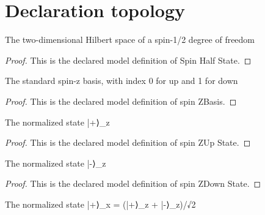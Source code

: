 \section{Declaration topology}
\begin{definition}
  \label{def:physics:phyx-mini-0543:phyxminiproblems-problemphyxmini0543-spinhalfstate}
  The two-dimensional Hilbert space of a spin-1/2 degree of freedom
\end{definition}
\begin{proof}
  This is the declared model definition of Spin Half State.
\end{proof}
\begin{definition}
  \label{def:physics:phyx-mini-0543:phyxminiproblems-problemphyxmini0543-spinzbasis}
  The standard spin-z basis, with index 0 for up and 1 for down
\end{definition}
\begin{proof}
  This is the declared model definition of spin ZBasis.
\end{proof}
\begin{definition}
  \label{def:physics:phyx-mini-0543:phyxminiproblems-problemphyxmini0543-spinzupstate}
  The normalized state |+⟩\_z
\end{definition}
\begin{proof}
  This is the declared model definition of spin ZUp State.
\end{proof}
\begin{definition}
  \label{def:physics:phyx-mini-0543:phyxminiproblems-problemphyxmini0543-spinzdownstate}
  The normalized state |-⟩\_z
\end{definition}
\begin{proof}
  This is the declared model definition of spin ZDown State.
\end{proof}
\begin{definition}
  \label{def:physics:phyx-mini-0543:phyxminiproblems-problemphyxmini0543-spinxupstate}
  The normalized state |+⟩\_x = (|+⟩\_z + |-⟩\_z)/√2
\end{definition}
